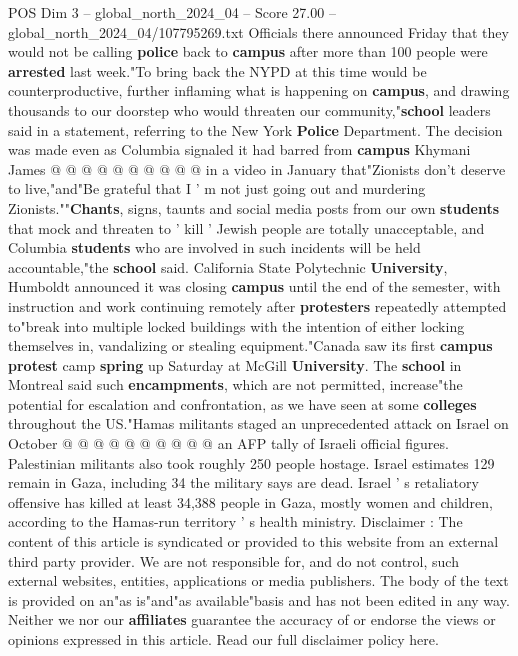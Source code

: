 \begin{textsample}{POS Dim 3 – global\_north\_2024\_04 – Score 27.00 – global\_north\_2024\_04/107795269.txt}
Officials there announced Friday that they would not be calling \textbf{police} back to \textbf{campus} after more than 100 people were \textbf{arrested} last week."To bring back the NYPD at this time would be counterproductive, further inflaming what is happening on \textbf{campus}, and drawing thousands to our doorstep who would threaten our community,"\textbf{school} leaders said in a statement, referring to the New York \textbf{Police} Department.
The decision was made even as Columbia signaled it had barred from \textbf{campus} Khymani James @ @ @ @ @ @ @ @ @ @ in a video in January that"Zionists don't deserve to live,"and"Be grateful that I ' m not just going out and murdering Zionists.""\textbf{Chants}, signs, taunts and social media posts from our own \textbf{students} that mock and threaten to ' kill ' Jewish people are totally unacceptable, and Columbia \textbf{students} who are involved in such incidents will be held accountable,"the \textbf{school} said.
California State Polytechnic \textbf{University}, Humboldt announced it was closing \textbf{campus} until the end of the semester, with instruction and work continuing remotely after \textbf{protesters} repeatedly attempted to"break into multiple locked buildings with the intention of either locking themselves in, vandalizing or stealing equipment."Canada saw its first \textbf{campus} \textbf{protest} camp \textbf{spring} up Saturday at McGill \textbf{University}.
The \textbf{school} in Montreal said such \textbf{encampments}, which are not permitted, increase"the potential for escalation and confrontation, as we have seen at some \textbf{colleges} throughout the US."Hamas militants staged an unprecedented attack on Israel on October @ @ @ @ @ @ @ @ @ @ an AFP tally of Israeli official figures.
Palestinian militants also took roughly 250 people hostage.
Israel estimates 129 remain in Gaza, including 34 the military says are dead.
Israel ' s retaliatory offensive has killed at least 34,388 people in Gaza, mostly women and children, according to the Hamas-run territory ' s health ministry.
Disclaimer : The content of this article is syndicated or provided to this website from an external third party provider.
We are not responsible for, and do not control, such external websites, entities, applications or media publishers.
The body of the text is provided on an"as is"and"as available"basis and has not been edited in any way.
Neither we nor our \textbf{affiliates} guarantee the accuracy of or endorse the views or opinions expressed in this article.
Read our full disclaimer policy here.

\end{textsample}
